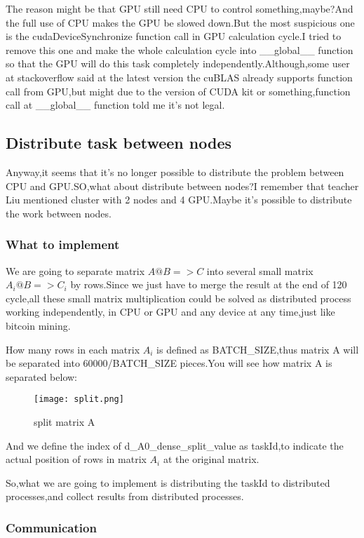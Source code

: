 \documentclass[12pt]{scrartcl} %
\begin{document}
The reason might be that GPU still need CPU to control something,maybe?And the full use of CPU makes the GPU be slowed down.But the most suspicious one is the cudaDeviceSynchronize function call in GPU calculation cycle.I tried to remove this one and make the whole calculation cycle into \_\_global\_\_ function so that the GPU will do this task completely independently.Although,some user at stackoverflow said at the latest version the cuBLAS already supports function call from GPU,but might due to the version of CUDA kit or something,function call at \_\_global\_\_ function told me it's not legal.
\subsection{Distribute task between nodes}
Anyway,it seems that it's no longer possible to distribute the problem between CPU and GPU.SO,what about distribute between nodes?I remember that teacher Liu mentioned cluster with 2 nodes and 4 GPU.Maybe it's possible to distribute the work between nodes.
\subsubsection{What to implement}
We are going to separate matrix $A@B=>C$ into several small matrix $A_{i}@B=>C_{i}$ by rows.Since we just have to merge the result at the end of 120 cycle,all these small matrix multiplication could be solved as distributed process working independently, in CPU or GPU and any device at any time,just like bitcoin mining.

How many rows in each matrix $A_{i}$ is defined as BATCH\_SIZE,thus matrix A will be separated into 60000/BATCH\_SIZE pieces.You will see how matrix A is separated below:
\begin{figure}[H]
    \centering
    \texttt{[image: split.png]}
    \caption{split matrix A}
    \label{}
\end{figure}

And we define the index of d\_A0\_dense\_split\_value as taskId,to indicate the actual position of rows in matrix $A_{i}$ at the original matrix.

So,what we are going to implement is distributing the taskId to distributed processes,and collect results from distributed processes.
\subsubsection{Communication}
\end{document}
